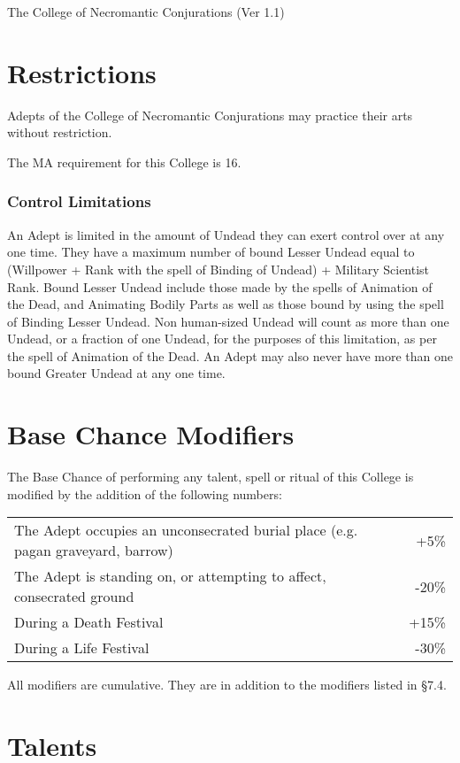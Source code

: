 \begin{Chapter}{The College of Necromantic Conjurations (Ver 1.1)}
\section{Restrictions}

Adepts of the College of Necromantic Conjurations may practice their
arts without restriction.

The MA requirement for this College is 16. 

\subsubsection{Control Limitations}

An Adept is limited in the amount of Undead they can exert control
over at any one time. They have a maximum number of bound Lesser
Undead equal to (Willpower + Rank with the spell of Binding of Undead)
+ Military Scientist Rank.  Bound Lesser Undead include those made by
the spells of Animation of the Dead, and Animating Bodily Parts as
well as those bound by using the spell of Binding Lesser Undead.  Non
human-sized Undead will count as more than one Undead, or a fraction
of one Undead, for the purposes of this limitation, as per the spell
of Animation of the Dead.  An Adept may also never have more than one
bound Greater Undead at any one time.

\section{Base Chance Modifiers}

The Base Chance of performing any talent, spell or ritual of this
College is modified by the addition of the following numbers:

\begin{tabularx}{\columnwidth}{Xr}
The Adept occupies an unconsecrated burial place (e.g. pagan graveyard, barrow) & +5\%  \\
The Adept is standing on, or attempting to affect, consecrated ground & -20\% \\
During a Death Festival  & +15\% \\
During a Life Festival & -30\% \\
\end{tabularx}

All modifiers are cumulative. They are in addition to the modifiers
listed in §7.4.

\section{Talents}


\end{Chapter}
